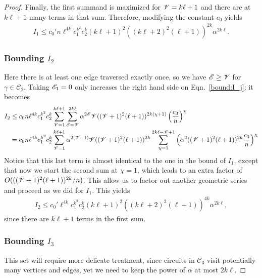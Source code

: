 \begin{proof}
Finally, the first summand is maximized for $\mathscr{V} = k\ell + 1$ and there are at $k\ell + 1$ many terms in that sum.
Therefore, modifying the constant $c_0$ yields
\begin{align}\label{bound:I_1}
I_1
\leq 
c_0' n 
\ell^{4k}
c_1^{ k^2}
c_2^k
(k \ell + 1)^2
\left( (k\ell+2)^2 (\ell+1) \right)^{2k}
\alpha^{2 k \ell}.
\end{align}

\subsubsection{Bounding $I_2$}

Here there is at least one edge traversed exactly once, so
we have $\mathscr{E} \geq \mathscr{V}$ for $\gamma\in \mathcal{C}_2$. 
Taking $\mathscr{E}_1 = 0$ only increases the right hand side on
Eqn.~\eqref{bound:I_j}; it becomes
\begin{align*}
I_2
&\leq 
c_0 n
\ell^{4k} 
c_1^{ k^2}
c_2^k
\sum_{\mathscr{V}=1}^{k\ell+1} \sum_{\mathscr{E}=\mathscr{V}}^{2k\ell} 
\alpha^{2\mathscr{E}}
\mathscr{V}
((\mathscr{V} + 1)^2 (\ell + 1))^{2k(\chi + 1)}
\left( \frac{c_3}{n} \right)^\chi
\\
&=
c_0 n
\ell^{4k} 
c_1^{ k^2}
c_2^k
\sum_{\mathscr{V} = 1}^{k\ell+1} 
\alpha^{2(\mathscr{V}-1)}
\mathscr{V}
((\mathscr{V} + 1)^2 (\ell + 1))^{2k}
\sum_{\chi= 1}^{2k\ell - \mathscr{V} + 1} 
\left( 
    \alpha^2
    ((\mathscr{V} + 1)^2 (\ell + 1))^{2k} 
    \frac{c_3}{n} 
\right)^\chi
\end{align*}
Notice that this last term is almost identical to the one in the bound of $I_1$, 
except that now we start the second sum at $\chi=1$,
which leads to an extra factor of
$
O( ((\mathscr{V} + 1)^2 (\ell + 1))^{2k} / n )
$.
This allow us to factor out another geometric series
and proceed as we did for $I_1$. 
This yields 
\begin{align}
I_2 
\leq 
c_0'
\ell^{4k}
c_1^{ k^2}
c_2^k
(k \ell+1)^2
\left( (k\ell+2)^2 (\ell+1) \right)^{4k}
\alpha^{2k\ell},
\label{bound:I_2}
\end{align} 
since there are $k\ell+1$ terms in the first sum.

\subsubsection{Bounding $I_3$}

This set will require more delicate treatment,
since circuits in $\mathcal{C}_3$ 
visit potentially many vertices and edges, 
yet we need to keep the power of $\alpha$ at most $2k\ell$.


\end{proof}
